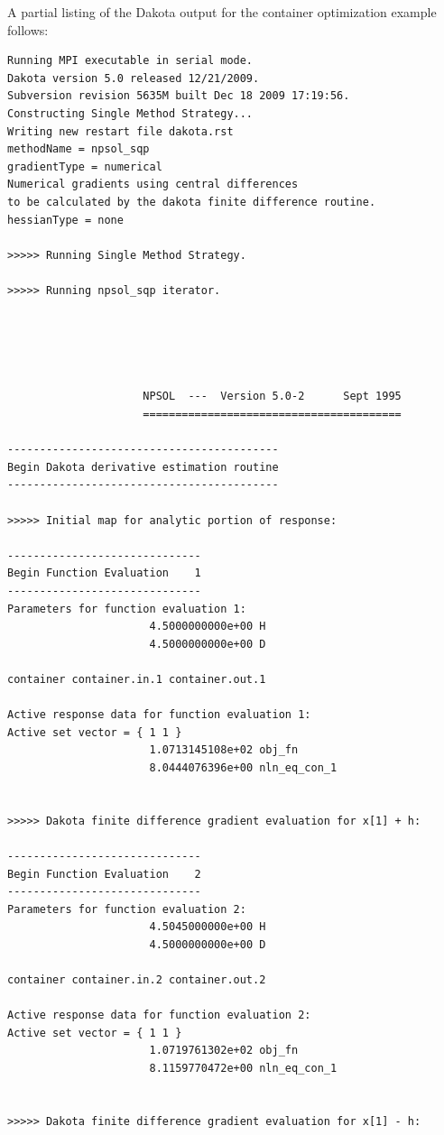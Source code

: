 A partial listing of the Dakota output for the container optimization
example follows:
\begin{small}
\begin{verbatim}
Running MPI executable in serial mode.
Dakota version 5.0 released 12/21/2009.
Subversion revision 5635M built Dec 18 2009 17:19:56.
Constructing Single Method Strategy...
Writing new restart file dakota.rst
methodName = npsol_sqp
gradientType = numerical
Numerical gradients using central differences
to be calculated by the dakota finite difference routine.
hessianType = none

>>>>> Running Single Method Strategy.

>>>>> Running npsol_sqp iterator.





                     NPSOL  ---  Version 5.0-2      Sept 1995
                     ========================================

------------------------------------------
Begin Dakota derivative estimation routine
------------------------------------------

>>>>> Initial map for analytic portion of response:

------------------------------
Begin Function Evaluation    1
------------------------------
Parameters for function evaluation 1:
                      4.5000000000e+00 H
                      4.5000000000e+00 D

container container.in.1 container.out.1

Active response data for function evaluation 1:
Active set vector = { 1 1 }
                      1.0713145108e+02 obj_fn
                      8.0444076396e+00 nln_eq_con_1


>>>>> Dakota finite difference gradient evaluation for x[1] + h:

------------------------------
Begin Function Evaluation    2
------------------------------
Parameters for function evaluation 2:
                      4.5045000000e+00 H
                      4.5000000000e+00 D

container container.in.2 container.out.2

Active response data for function evaluation 2:
Active set vector = { 1 1 }
                      1.0719761302e+02 obj_fn
                      8.1159770472e+00 nln_eq_con_1


>>>>> Dakota finite difference gradient evaluation for x[1] - h:


\end{verbatim}
\end{small}
